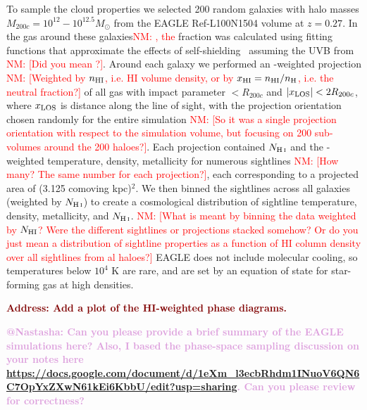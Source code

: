 \documentclass[fleqn,usenatbib]{mnras}
\makeatletter
\newcommand{\todo}[1]{\textcolor{Maroon}{\textbf{Address: #1}}}
\newcommand{\atnastasha}[1]{\textcolor{Plum}{\textbf{@Nastasha: #1}}}
\newcommand{\nmr}[1]{\textcolor{red}{NM: #1}}
\makeatother
\begin{document}
To sample the cloud properties we selected 200 random galaxies with halo masses $M_{200c} = 10^{12} - 10^{12.5} M_\odot$ from the EAGLE Ref-L100N1504 volume at $z=0.27$.
In the gas around these galaxies\nmr{, the}  fraction was calculated using fitting functions that approximate the effects of self-shielding~\citep{Rahmati2013} assuming the UVB from \cite{Haardt2001} \nmr{[Did you mean \cite{Haardt2012}?]}.
Around each galaxy we performed an -weighted projection \nmr{[Weighted by $n_{\rm HI}$, i.e. HI volume density, or by $x_{\rm HI}=n_{\rm HI}/n_{\rm H}$, i.e. the neutral fraction?]} of all gas with impact parameter $< R_{200c}$ and $\vert x_{\rm LOS} \vert < 2 R_{200c}$, where $x_{\rm LOS}$ is distance along the line of sight, with the projection orientation chosen randomly for the entire simulation \nmr{[So it was a single projection orientation with respect to the simulation volume, but focusing on 200 sub-volumes around the 200 haloes?]}.
Each projection contained $N_{\ion{H}{I}}$ and the -weighted temperature, density, metallicity for numerous sightlines \nmr{[How many? The same number for each projection?]}, each corresponding to a projected area of (3.125 comoving kpc)$^2$.
We then binned the sightlines across all galaxies (weighted by $N_{\ion{H}{I}}$) to create a cosmological distribution of sightline temperature, density, metallicity, and $N_{\ion{H}{I}}$. \nmr{[What is meant by binning the data weighted by $N_{\rm HI}$? Were the different sightlines or projections stacked somehow? Or do you just mean a distribution of sightline properties as a function of HI column density over all sightlines from al haloes?]} 
EAGLE does not include molecular cooling, so temperatures below $10^4$ K are rare, and are set by an equation of state for star-forming gas at high densities.

\todo{Add a plot of the HI-weighted phase diagrams.}

\atnastasha{
Can you please provide a brief summary of the EAGLE simulations here?
Also, I based the phase-space sampling discussion on your notes here \url{https://docs.google.com/document/d/1eXm_l3ecbRhdm1INuoV6QN6C7OpYxZXwN61kEi6KbbU/edit?usp=sharing}.
Can you please review for correctness?
}
\end{document}

